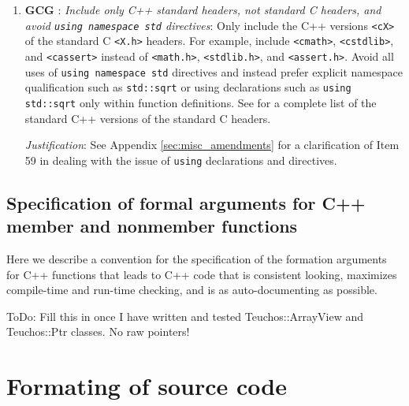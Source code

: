 \begin{enumerate}
{}\item{}\textbf{GCG }:
{}\textit{Include only C++ standard headers, not standard C headers, and avoid
{}\texttt{using namespace std} directives}: Only include the C++ versions
{}\texttt{<cX>} of the standard C {}\texttt{<X.h>} headers.  For example,
include {}\texttt{<cmath>}, {}\texttt{<cstdlib>}, and {}\texttt{<cassert>}
instead of {}\texttt{<math.h>}, {}\texttt{<stdlib.h>}, and
{}\texttt{<assert.h>}.  Avoid all uses of {}\texttt{using namespace std}
directives and instead prefer explicit namespace qualification such as
{}\texttt{std::sqrt} or using declarations such as {}\texttt{using std::sqrt}
only within function definitions.  See {}\cite[Section ???]{stroustrup97} for
a complete list of the standard C++ versions of the standard C headers.

{}\textit{Justification}: See Appendix {}\ref{sec:misc_amendments} for a
clarification of Item 59 in {}\cite{C++CodingStandards05} dealing with the
issue of {}\texttt{using} declarations and directives.


\end{enumerate}

%
\subsection{Specification of formal arguments for C++ member and nonmember functions}
%

Here we describe a convention for the specification of the formation arguments
for C++ functions that leads to C++ code that is consistent looking, maximizes
compile-time and run-time checking, and is as auto-documenting as possible.

ToDo: Fill this in once I have written and tested Teuchos\-::ArrayView and
Teuchos\-::Ptr classes.  No raw pointers!
%
\section{Formating of source code}
\label{thyracodingguidelines:formatting:sec}
%

